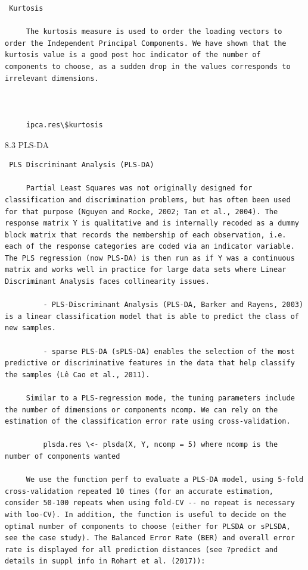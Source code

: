 \documentclass[
]{book}
\begin{document}
\begin{enumerate}
\begin{verbatim}
 Kurtosis

     The kurtosis measure is used to order the loading vectors to order the Independent Principal Components. We have shown that the kurtosis value is a good post hoc indicator of the number of components to choose, as a sudden drop in the values corresponds to irrelevant dimensions.



     ipca.res\$kurtosis
\end{verbatim}

  8.3 PLS-DA

\begin{verbatim}
 PLS Discriminant Analysis (PLS-DA)

     Partial Least Squares was not originally designed for classification and discrimination problems, but has often been used for that purpose (Nguyen and Rocke, 2002; Tan et al., 2004). The response matrix Y is qualitative and is internally recoded as a dummy block matrix that records the membership of each observation, i.e. each of the response categories are coded via an indicator variable. The PLS regression (now PLS-DA) is then run as if Y was a continuous matrix and works well in practice for large data sets where Linear Discriminant Analysis faces collinearity issues.

         - PLS-Discriminant Analysis (PLS-DA, Barker and Rayens, 2003) is a linear classification model that is able to predict the class of new samples.

         - sparse PLS-DA (sPLS-DA) enables the selection of the most predictive or discriminative features in the data that help classify the samples (Lê Cao et al., 2011).

     Similar to a PLS-regression mode, the tuning parameters include the number of dimensions or components ncomp. We can rely on the estimation of the classification error rate using cross-validation.

         plsda.res \<- plsda(X, Y, ncomp = 5) where ncomp is the number of components wanted

     We use the function perf to evaluate a PLS-DA model, using 5-fold cross-validation repeated 10 times (for an accurate estimation, consider 50-100 repeats when using fold-CV -- no repeat is necessary with loo-CV). In addition, the function is useful to decide on the optimal number of components to choose (either for PLSDA or sPLSDA, see the case study). The Balanced Error Rate (BER) and overall error rate is displayed for all prediction distances (see ?predict and details in suppl info in Rohart et al. (2017)):


\end{verbatim}
\end{enumerate}
\end{document}
